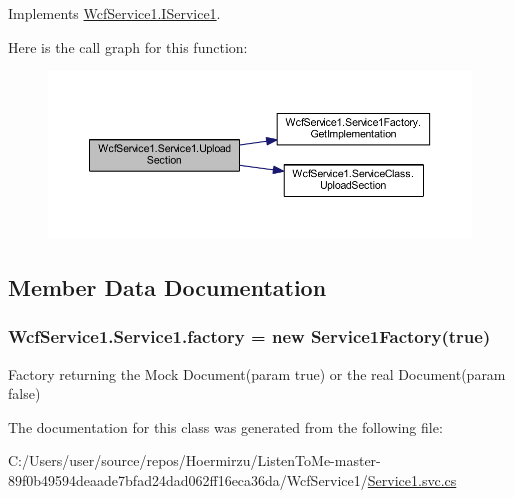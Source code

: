Implements \hyperlink{interface_wcf_service1_1_1_i_service1_a40f5fb59f7eb2c10dc216bceb4fc366c}{Wcf\+Service1.\+I\+Service1}.



Here is the call graph for this function\+:\nopagebreak
\begin{figure}[H]
\begin{center}
\leavevmode
\includegraphics[width=350pt]{class_wcf_service1_1_1_service1_a4ba31cd1a202c84fac4d03461d8f4361_cgraph}
\end{center}
\end{figure}




\subsection{Member Data Documentation}
\subsubsection[{\texorpdfstring{factory}{factory}}]{ Wcf\+Service1.\+Service1.\+factory = new {\bf Service1\+Factory}(true)\hspace{0.3cm}{\ttfamily [private]}}\hypertarget{class_wcf_service1_1_1_service1_a7ff9458393176c80aa7d4365896de3b0}{}\label{class_wcf_service1_1_1_service1_a7ff9458393176c80aa7d4365896de3b0}


Factory returning the Mock Document(param true) or the real Document(param false) 



The documentation for this class was generated from the following file\+:\begin{DoxyCompactItemize}
\item 
C\+:/\+Users/user/source/repos/\+Hoermirzu/\+Listen\+To\+Me-\/master-\/89f0b49594deaade7bfad24dad062ff16eca36da/\+Wcf\+Service1/\hyperlink{_service1_8svc_8cs}{Service1.\+svc.\+cs}\end{DoxyCompactItemize}
